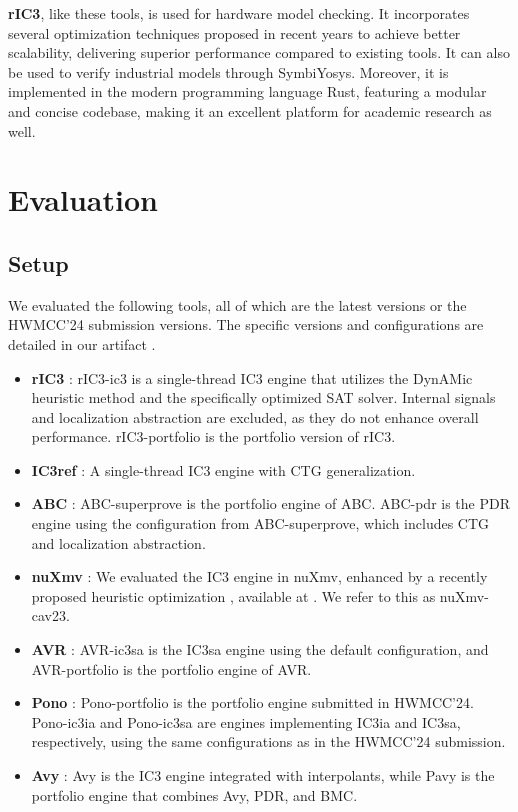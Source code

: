 \documentclass[runningheads]{llncs}
\begin{document}
\textbf{rIC3}, like these tools, is used for hardware model checking. It incorporates several optimization techniques proposed in recent years to achieve better scalability, delivering superior performance compared to existing tools. It can also be used to verify industrial models through SymbiYosys. Moreover, it is implemented in the modern programming language Rust, featuring a modular and concise codebase, making it an excellent platform for academic research as well.

\section{Evaluation}
\label{SEC:Evaluation}
\subsection{Setup}
We evaluated the following tools, all of which are the latest versions or the HWMCC'24 submission versions. The specific versions and configurations are detailed in our artifact \cite{Artifact}.
\begin{itemize}
    \item \textbf{rIC3} \cite{rIC3}: rIC3-ic3 is a single-thread IC3 engine that utilizes the DynAMic heuristic method and the specifically optimized SAT solver. Internal signals and localization abstraction are excluded, as they do not enhance overall performance. rIC3-portfolio is the portfolio version of rIC3.
    \item \textbf{IC3ref} \cite{IC3ref}: A single-thread IC3 engine with CTG generalization.
    \item \textbf{ABC} \cite{ABC}: ABC-superprove \cite{SuperProve} is the portfolio engine of ABC. ABC-pdr is the PDR engine using the configuration from ABC-superprove, which includes CTG and localization abstraction.
    \item \textbf{nuXmv} \cite{NUXMV}: We evaluated the IC3 engine in nuXmv, enhanced by a recently proposed heuristic optimization \cite{IGoodLemma}, available at \cite{IGoodLemmaArtifact}. We refer to this as nuXmv-cav23.
    \item \textbf{AVR} \cite{AVR}: AVR-ic3sa is the IC3sa engine using the default configuration, and AVR-portfolio is the portfolio engine of AVR.
    \item \textbf{Pono} \cite{PONO}: Pono-portfolio is the portfolio engine submitted in HWMCC'24. Pono-ic3ia and Pono-ic3sa are engines implementing IC3ia and IC3sa, respectively, using the same configurations as in the HWMCC'24 submission.
    \item \textbf{Avy} \cite{Avy}: Avy is the IC3 engine integrated with interpolants, while Pavy \cite{Pavy} is the portfolio engine that combines Avy, PDR, and BMC.
\end{itemize}
\end{document}
